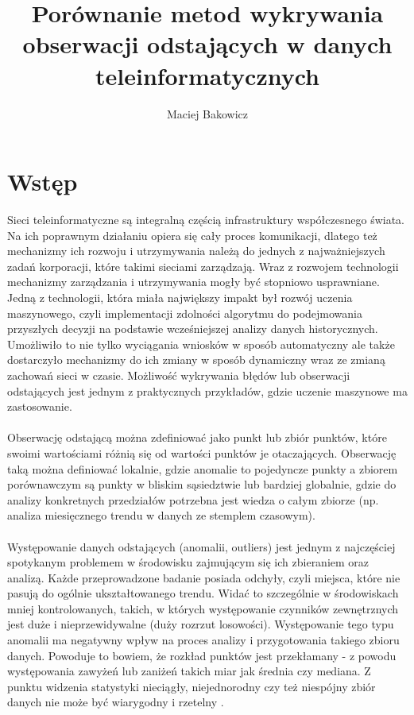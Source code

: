 \documentclass[eng,printmode]{mgr}
\title{Porównanie metod wykrywania obserwacji odstających w danych teleinformatycznych}
\author{Maciej Bakowicz}
\begin{document}

\maketitle 

\tableofcontents 

\chapter{Wstęp}  
Sieci teleinformatyczne są integralną częścią infrastruktury współczesnego świata. Na ich poprawnym działaniu opiera się cały proces komunikacji, dlatego też mechanizmy ich rozwoju i utrzymywania należą do jednych z najważniejszych zadań korporacji, które takimi sieciami zarządzają. Wraz z rozwojem technologii mechanizmy zarządzania i utrzymywania mogły być stopniowo usprawniane. Jedną z technologii, która miała największy impakt był rozwój uczenia maszynowego, czyli implementacji zdolności algorytmu do podejmowania przyszłych decyzji na podstawie wcześniejszej analizy danych historycznych. Umożliwiło to nie tylko wyciągania wniosków w sposób automatyczny ale także dostarczyło mechanizmy do ich zmiany w sposób dynamiczny wraz ze zmianą zachowań sieci w czasie. Możliwość wykrywania błędów lub obserwacji odstających jest jednym z praktycznych przykładów, gdzie uczenie maszynowe ma zastosowanie. \cite{ml-book}
\\\\
Obserwację odstającą można zdefiniować jako punkt lub zbiór punktów, które swoimi wartościami różnią się od wartości punktów je otaczających. Obserwację taką można definiować lokalnie, gdzie anomalie to pojedyncze punkty a zbiorem porównawczym są punkty w bliskim sąsiedztwie lub bardziej globalnie, gdzie do analizy konkretnych przedziałów potrzebna jest wiedza o całym zbiorze (np. analiza miesięcznego trendu w danych ze stemplem czasowym). 
\\ \\
Występowanie danych odstających (anomalii, outliers) jest jednym z najczęściej spotykanym problemem w środowisku zajmującym się ich zbieraniem oraz analizą. Każde przeprowadzone badanie posiada odchyły, czyli miejsca, które nie pasują do ogólnie ukształtowanego trendu. Widać to szczególnie w środowiskach mniej kontrolowanych, takich, w których występowanie czynników zewnętrznych jest duże i nieprzewidywalne (duży rozrzut losowości). Występowanie tego typu anomalii ma negatywny wpływ na proces analizy i przygotowania takiego zbioru danych. Powoduje to bowiem, że rozkład punktów jest przekłamany - z powodu występowania zawyżeń lub zaniżeń takich miar jak średnia czy mediana. Z punktu widzenia statystyki nieciągły, niejednorodny czy też niespójny zbiór danych nie może być wiarygodny i rzetelny \cite{outliers-impact}.
\end{document}
